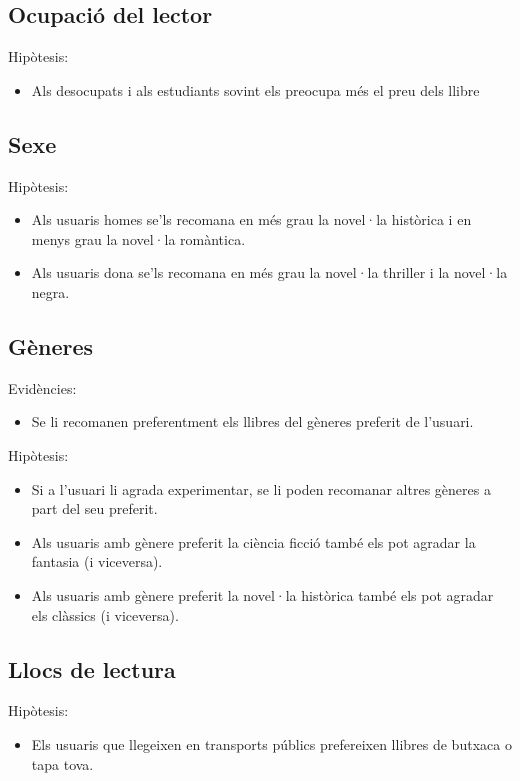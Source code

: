 \subsection{Ocupació del lector}
Hipòtesis:
\begin{itemize}
  \item Als desocupats i als estudiants sovint els preocupa més el preu dels llibre
\end{itemize}

\subsection{Sexe}
Hipòtesis:
\begin{itemize}
  \item Als usuaris homes se'ls recomana en més grau la novel·la històrica i en menys grau la novel·la romàntica.
  \item Als usuaris dona se'ls recomana en més grau la novel·la thriller i la novel·la negra.
\end{itemize}

\subsection{Gèneres}
Evidències:
\begin{itemize}
  \item Se li recomanen preferentment els llibres del gèneres preferit de l'usuari.  
\end{itemize}
Hipòtesis:
\begin{itemize}
  \item Si a l'usuari li agrada experimentar, se li poden recomanar altres gèneres a part del seu preferit.  
  \item Als usuaris amb gènere preferit la ciència ficció també els pot agradar la fantasia (i viceversa).
  \item Als usuaris amb gènere preferit la novel·la històrica també els pot agradar els clàssics (i viceversa).
\end{itemize}

\subsection{Llocs de lectura}
Hipòtesis:
\begin{itemize}
  \item Els usuaris que llegeixen en transports públics prefereixen llibres de butxaca o tapa tova.
\end{itemize}

